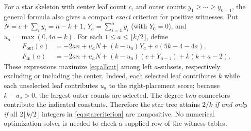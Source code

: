 \documentclass[11pt,a4paper]{article}
\begin{document}
For a star skeleton with center leaf count $c$, and outer counts $y_1\ge\cdots\ge y_{k-1}$, the general formula also gives a compact \emph{exact} criterion for positive witnesses. Put $N=c+\sum_i y_i=n-k+1$, $Y_a=\sum_{i=1}^a y_i$ (with $Y_0=0$), and $u_a=\max(0,4a-k)$. For each $1\le a\le\lfloor k/2\rfloor$, define
\begin{align}\label{eq:starcriterion}
F_{\mathrm{out}}(a)&=-2an+u_a N+(k-u_a)Y_a+a(5k-4-4a),\\
F_{\mathrm{in}}(a)&=-2an+u_a N+(k-u_a)(c+Y_{a-1})+k(k+a-2).
\end{align}
These expressions maximize \eqref{eq:allcut} among left $a$-subsets, respectively excluding or including the center. Indeed, each selected leaf contributes $k$ while each unselected leaf contributes $u_a$ to the right-placement score; because $k-u_a>0$, the largest outer counts are selected. The degree-two connectors contribute the indicated constants. Therefore the star tree attains $2/k$ \emph{if and only if} all $2\lfloor k/2\rfloor$ integers in \eqref{eq:starcriterion} are nonpositive. No numerical optimization solver is needed to check a supplied row of the witness tables.
\end{document}
